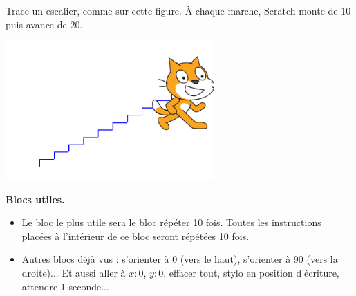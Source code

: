 \documentclass[class=report,crop=false, 12pt]{standalone}
\begin{document}




\bigskip
\bigskip


\begin{activite}
Trace un escalier, comme sur cette figure. À chaque marche, Scratch monte de 10 puis avance de 20.

\begin{center}
  \includegraphics[width=0.6\textwidth]{ecran-02-ex1}   
\end{center}

\textbf{Blocs utiles.}
\begin{itemize}
  \item Le bloc le plus utile sera le bloc \og{}répéter 10 fois\fg{}. Toutes les instructions placées à l'intérieur de ce bloc seront répétées 10 fois.
  
\begin{center}
\begin{scratch}
  {
    \blockspace[1]
  }
\end{scratch}
\end{center} 
  
  \item Autres blocs déjà vus : \og{}s’orienter à 0\textdegree\fg{} (vers le haut), \og{}s’orienter à 90\textdegree\fg{} (vers la droite)...
Et aussi \og{}aller à $x:0$, $y:0$\fg{}, \og{}effacer tout\fg{}, \og{}stylo en position d’écriture\fg{}, \og{}attendre 1 seconde\fg{}...
\end{itemize}

\end{activite}
\end{document}
